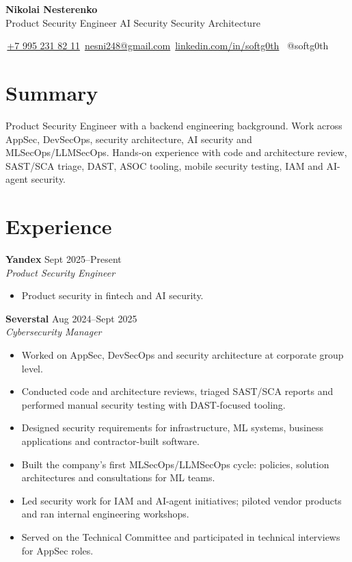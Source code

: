 \documentclass[10pt,a4paper]{article}
\begin{document}
\begin{center}
  {\LARGE\bfseries Nikolai Nesterenko}\\[-1pt]
  Product Security Engineer \textbar{} AI Security \textbar{} Security Architecture
\end{center}

\vspace{-2pt}
\begin{center}
\faPhone*\,\href{tel:+79952318211}{+7 995 231 82 11}
\quad
\faEnvelope\,\href{mailto:nesni248@gmail.com}{nesni248@gmail.com}
\quad
\faLinkedin\,\href{https://www.linkedin.com/in/softg0th}{linkedin.com/in/softg0th}
\quad
\faTelegram\, @softg0th
\end{center}

\section*{Summary}
Product Security Engineer with a backend engineering background. Work across AppSec, DevSecOps, security architecture, AI security and MLSecOps/LLMSecOps. Hands-on experience with code and architecture review, SAST/SCA triage, DAST, ASOC tooling, mobile security testing, IAM and AI-agent security.

\section*{Experience}

\textbf{Yandex} \hfill Sept 2025--Present\\
\textit{Product Security Engineer}
\begin{itemize}
  \item Product security in fintech and AI security.
\end{itemize}

\textbf{Severstal} \hfill Aug 2024--Sept 2025\\
\textit{Cybersecurity Manager}
\begin{itemize}
  \item Worked on AppSec, DevSecOps and security architecture at corporate group level.
  \item Conducted code and architecture reviews, triaged SAST/SCA reports and performed manual security testing with DAST-focused tooling.
  \item Designed security requirements for infrastructure, ML systems, business applications and contractor-built software.
  \item Built the company's first MLSecOps/LLMSecOps cycle: policies, solution architectures and consultations for ML teams.
  \item Led security work for IAM and AI-agent initiatives; piloted vendor products and ran internal engineering workshops.
  \item Served on the Technical Committee and participated in technical interviews for AppSec roles.
\end{itemize}
\end{document}
